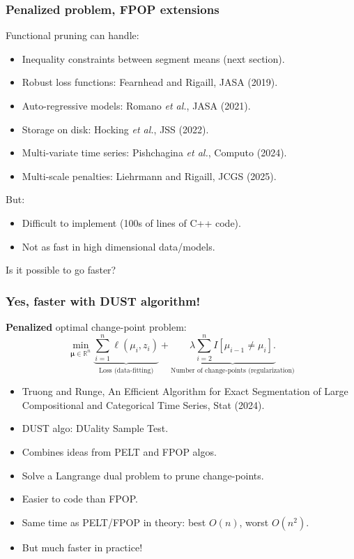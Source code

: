 \documentclass{beamer}
\newcommand{\RR}{\mathbb R}
\begin{document}
\begin{frame}
  \frametitle{Penalized problem, FPOP extensions}
Functional pruning can handle:
\begin{itemize}
\item Inequality constraints between segment means (next section).
\item Robust loss functions: Fearnhead and Rigaill,
  JASA (2019).
\item Auto-regressive models: Romano \emph{et al.},
  JASA (2021).
\item Storage on disk: Hocking \emph{et al.}, JSS (2022).
\item Multi-variate time series: Pishchagina \emph{et al.},
  Computo (2024).
\item Multi-scale penalties: Liehrmann and Rigaill, JCGS (2025).
\end{itemize}
But:
\begin{itemize}
\item Difficult to implement (100s of lines of C++ code).
\item Not as fast in high dimensional data/models.
\end{itemize}
Is it possible to go faster?
\end{frame}

\begin{frame}
  \frametitle{Yes, faster with DUST algorithm!}
  \textbf{Penalized} optimal change-point problem:
$$
\min_{
  \mathbf \mu\in\RR^{n}
}
\underbrace{\sum_{i=1}^{n} \ell( \mu_i,  z_i)}_{\text{Loss (data-fitting)}} + \underbrace{\lambda\sum_{i=2}^n I[\mu_{i-1}\neq \mu_i].}_{\text{Number of change-points (regularization)}}
$$
\begin{itemize}
\item Truong and Runge, An Efficient Algorithm for Exact
  Segmentation of Large Compositional and Categorical Time Series,
  Stat (2024).
\item DUST algo: DUality Sample Test.
\item Combines ideas from PELT and FPOP algos.
\item Solve a Langrange dual problem to prune change-points.
\item Easier to code than FPOP.
\item Same time as PELT/FPOP in theory: best $O(n)$, worst $O(n^2)$.
\item But much faster in practice!
\end{itemize}
\end{frame}
\end{document}
